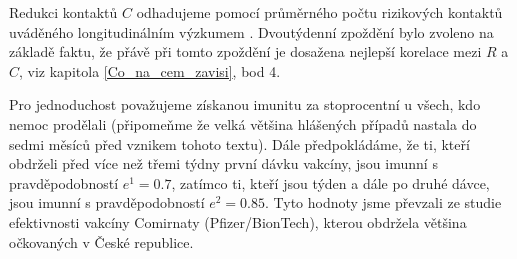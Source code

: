 Redukci kontaktů $C$ odhadujeme pomocí průměrného počtu rizikových
kontaktů uváděného longitudinálním výzkumem \cite{paqcovid}. Dvoutýdenní zpoždění bylo zvoleno na základě faktu, že přávě při tomto zpoždění je dosažena nejlepší korelace mezi $R$ a $C$, viz kapitola \ref{Co_na_cem_zavisi}, bod 4. 

Pro jednoduchost považujeme získanou imunitu za stoprocentní u všech,
kdo nemoc prodělali (připomeňme že velká většina hlášených případů
nastala do sedmi měsíců před vznikem tohoto textu). Dále předpokládáme,
že ti, kteří obdrželi před více než třemi týdny první dávku vakcíny,
jsou imunní s pravděpodobností $e^{1}=0.7$, zatímco ti, kteří jsou
týden a dále po druhé dávce, jsou imunní s pravděpodobností $e^{2}=0.85$.
Tyto hodnoty jsme převzali ze studie \cite{hall2021covid} efektivnosti
vakcíny Comirnaty (Pfizer/BionTech), kterou obdržela většina očkovaných
v České republice. 

